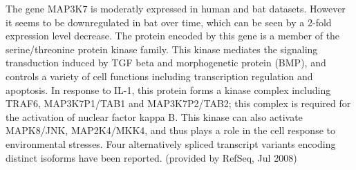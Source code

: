 
The gene MAP3K7 is moderatly expressed in human and bat datasets. However it seems to be downregulated in bat over time, which can be seen by a 2-fold expression level decrease.
    The protein encoded by this gene is a member of the serine/threonine protein kinase family. This kinase mediates
    the signaling transduction induced by TGF beta and morphogenetic protein (BMP), and controls a variety of cell
    functions including transcription regulation and apoptosis. In response to IL-1, this protein forms a kinase
    complex including TRAF6, MAP3K7P1/TAB1 and MAP3K7P2/TAB2; this complex is required for the activation of nuclear
    factor kappa B. This kinase can also activate MAPK8/JNK, MAP2K4/MKK4, and thus plays a role in the cell response
    to environmental stresses. Four alternatively spliced transcript variants encoding distinct isoforms have been
    reported. (provided by RefSeq, Jul 2008)






\setcounter{figure}{0}
